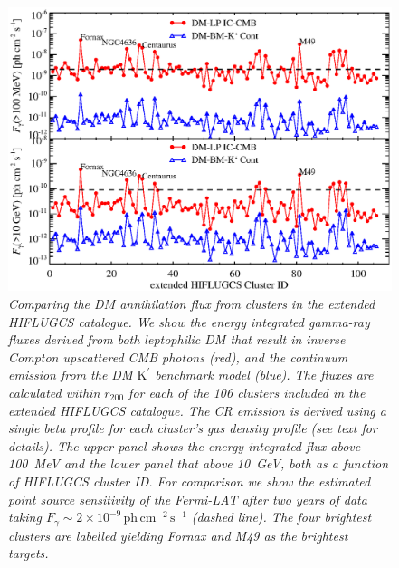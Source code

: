 \documentclass[10pt,aps,pra,reprint,amsmath,amsfonts,amssymb,showpacs,nofootinbib,floatfix]{revtex4-1}
\newcommand{\rmn}{\mathrm}
\newcommand{\Kp}{\rmn{K}^\prime}
\newcommand{\rvir}{r_{200}}
\begin{document}
\begin{figure}%
\begin{minipage}{2.0\columnwidth}
 \includegraphics[width=0.99\columnwidth]{figures/Flux.comp.DM.eps}
 \caption{\it Comparing the DM annihilation flux from clusters in the
   extended HIFLUGCS catalogue. We show the energy integrated
   gamma-ray fluxes derived from both leptophilic DM that result in
   inverse Compton upscattered CMB photons (red), and the continuum
   emission from the DM $\Kp$ benchmark model (blue). The fluxes are
   calculated within $\rvir$ for each of the 106 clusters included in
   the extended HIFLUGCS catalogue. The CR emission is derived using a
   single beta profile for each cluster's gas density profile (see
   text for details). The upper panel shows the energy integrated flux
   above 100~MeV and the lower panel that above 10~GeV, both as a
   function of HIFLUGCS cluster ID. For comparison we show the
   estimated point source sensitivity of the Fermi-LAT after two years
   of data taking $F_\gamma\sim 2\times10^{-9}\,\rmn{ph}\,
   \rmn{cm}^{-2}\,\rmn{s}^{-1}$ (dashed line). The four brightest
   clusters are labelled yielding Fornax and M49 as the brightest
   targets.}
 \label{fig21}
\end{minipage}
\end{figure}
\end{document}
